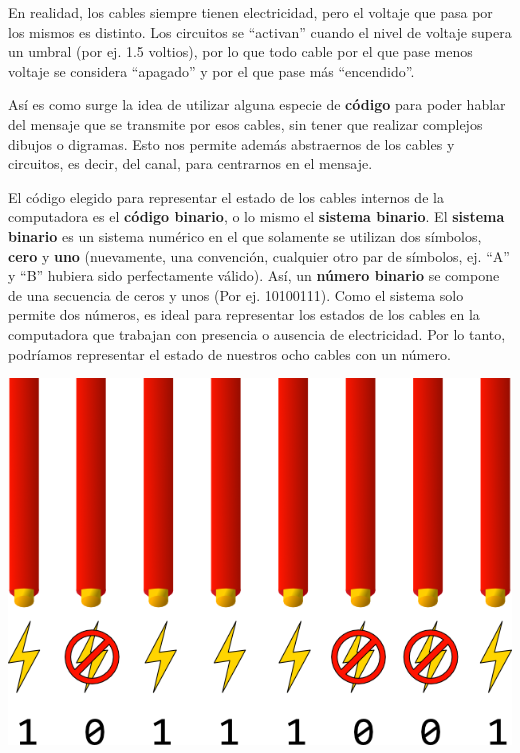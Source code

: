 \begin{knowwhat}[En realidad]
En realidad, los cables siempre tienen electricidad,
pero el voltaje que pasa por los mismos es distinto. Los circuitos se ``activan''
cuando el nivel de voltaje supera un umbral (por ej. 1.5 voltios), por lo que
todo cable por el que pase menos voltaje se considera ``apagado'' y por el que
pase más ``encendido''.
\end{knowwhat}

Así es como surge la idea de utilizar alguna especie de \textbf{código} para
poder hablar del mensaje que se transmite por esos cables, sin tener que realizar
complejos dibujos o digramas. Esto nos permite además abstraernos de los cables
y circuitos, es decir, del canal, para centrarnos en el mensaje.

El código elegido para representar el estado de los cables internos de la
computadora es el \textbf{código binario}, o lo mismo el \textbf{sistema binario}.
El \textbf{sistema binario} es un sistema numérico en el que solamente se utilizan
dos símbolos, \textbf{cero} y \textbf{uno} (nuevamente, una convención, cualquier
otro par de símbolos, ej. ``A'' y ``B'' hubiera sido perfectamente válido).
Así, un \textbf{número binario} se compone de una secuencia de
ceros y unos (Por ej. 10100111). Como el sistema solo permite dos números, es
ideal para representar los estados de los cables en la computadora que trabajan
con presencia o ausencia de electricidad. Por lo tanto, podríamos representar
el estado de nuestros ocho cables con un número.

\centerline{\includegraphics[]{capitulos/bajo_nivel/imagenes/binary_cables_electricity.png}}

